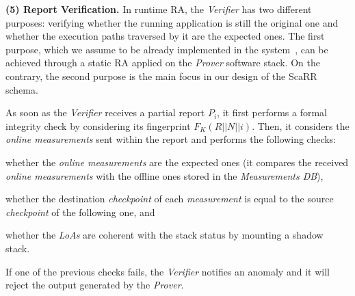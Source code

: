 


\textbf{(5) Report Verification.}  
In runtime RA, the \emph{Verifier} has two different purposes: verifying 
whether the running application is still the original one and whether the 
execution paths traversed by it are the expected ones. The first purpose, which 
we assume to be already implemented in the 
system~\cite{costan2016intel,winter2008trusted}, can be achieved through a 
static RA applied on the \emph{Prover} software stack. On the contrary, the 
second purpose is the main focus in our design of the ScaRR schema. 

As soon as the \emph{Verifier} receives a partial report $P_i$, it first 
performs a formal integrity check by considering its fingerprint 
$F_K(R||N||i)$. Then, it considers the \emph{online measurements} sent within 
the report and performs the following checks: 
\begin{enumerate*}[label=(C\arabic*)]
	\item whether the \emph{online measurements} are the expected ones (\ie it 
	compares the received \emph{online measurements} with the offline ones 
	stored in the \emph{Measurements DB}),
	\item whether the destination \emph{checkpoint} of each \emph{measurement} 
	is equal to the source \emph{checkpoint} of the following one, and
	\item whether the \emph{LoAs} are coherent with the stack status by 
	mounting a shadow stack.
\end{enumerate*}
If one of the previous checks fails, the \emph{Verifier} notifies an anomaly 
and it will reject the output generated by the \emph{Prover}.

